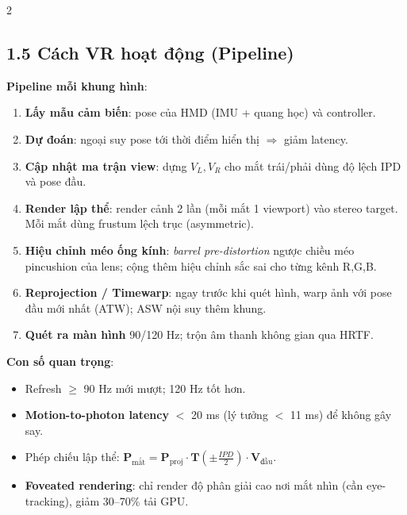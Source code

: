\begin{paracol}{2}
\switchcolumn

\subsection*{1.5 Cách VR hoạt động (Pipeline)}
\textbf{Pipeline mỗi khung hình}:
\begin{enumerate}[leftmargin=*,nosep]
  \item \textbf{Lấy mẫu cảm biến}: pose của HMD (IMU + quang học) và controller.
  \item \textbf{Dự đoán}: ngoại suy pose tới thời điểm hiển thị $\Rightarrow$ giảm latency.
  \item \textbf{Cập nhật ma trận view}: dựng $V_L, V_R$ cho mắt trái/phải dùng độ lệch IPD và pose đầu.
  \item \textbf{Render lập thể}: render cảnh 2 lần (mỗi mắt 1 viewport) vào stereo target. Mỗi mắt dùng frustum lệch trục (asymmetric).
  \item \textbf{Hiệu chỉnh méo ống kính}: \emph{barrel pre-distortion} ngược chiều méo pincushion của lens; cộng thêm hiệu chỉnh sắc sai cho từng kênh R,G,B.
  \item \textbf{Reprojection / Timewarp}: ngay trước khi quét hình, warp ảnh với pose đầu mới nhất (ATW); ASW nội suy thêm khung.
  \item \textbf{Quét ra màn hình} 90/120 Hz; trộn âm thanh không gian qua HRTF.
\end{enumerate}
\textbf{Con số quan trọng}:
\begin{itemize}[leftmargin=*,nosep]
  \item Refresh $\geq$ 90 Hz mới mượt; 120 Hz tốt hơn.
  \item \textbf{Motion-to-photon latency} $<$ 20 ms (lý tưởng $<$ 11 ms) để không gây say.
  \item Phép chiếu lập thể: $\mathbf{P}_{\text{mắt}} = \mathbf{P}_{\text{proj}} \cdot \mathbf{T}(\pm \tfrac{IPD}{2}) \cdot \mathbf{V}_{\text{đầu}}$.
  \item \textbf{Foveated rendering}: chỉ render độ phân giải cao nơi mắt nhìn (cần eye-tracking), giảm 30–70\% tải GPU.
\end{itemize}

\switchcolumn*


\end{paracol}
